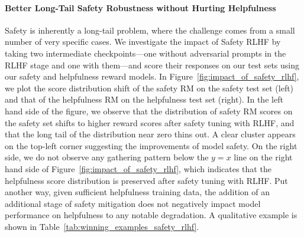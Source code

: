 \paragraph{Better Long-Tail Safety Robustness without Hurting Helpfulness}
Safety is inherently a long-tail problem, where the challenge comes from a small number of very specific cases.
We investigate the impact of Safety RLHF by taking two intermediate \modelname checkpoints---one without adversarial prompts in the RLHF stage and one with them---and score their responses on our test sets using our safety and helpfulness reward models.
In Figure~\ref{fig:impact_of_safety_rlhf}, we plot the score distribution shift of the safety RM on the safety test set (left) and that of the helpfulness RM on the helpfulness test set (right).
In the left hand side of the figure, we observe that the distribution of safety RM scores on the safety set shifts to higher reward scores after safety tuning with RLHF, and that the long tail of the distribution near zero thins out. A clear cluster appears on the top-left corner suggesting the improvements of model safety. 
On the right side, we do not observe any gathering pattern below the $y=x$ line on the right hand side of Figure~\ref{fig:impact_of_safety_rlhf}, which indicates that the helpfulness score distribution is preserved after safety tuning with RLHF. Put another way, given sufficient helpfulness training data, the addition of an additional stage of safety mitigation does not negatively impact model performance on helpfulness to any notable degradation. A qualitative example is shown in Table~\ref{tab:winning_examples_safety_rlhf}. 

